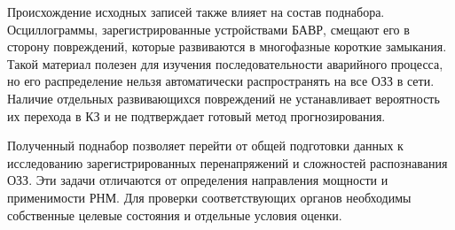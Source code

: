 Происхождение исходных записей также влияет на состав поднабора.
Осциллограммы, зарегистрированные устройствами БАВР, смещают его
в сторону повреждений, которые развиваются в многофазные короткие
замыкания. Такой материал полезен для изучения последовательности
аварийного процесса, но его распределение нельзя автоматически
распространять на все ОЗЗ в сети. Наличие отдельных развивающихся
повреждений не устанавливает вероятность их перехода в КЗ
и не подтверждает готовый метод прогнозирования.

Полученный поднабор позволяет перейти от общей подготовки данных
к исследованию зарегистрированных перенапряжений и сложностей
распознавания ОЗЗ. Эти задачи отличаются от определения направления
мощности и применимости РНМ. Для проверки соответствующих органов
необходимы собственные целевые состояния и отдельные условия оценки.
